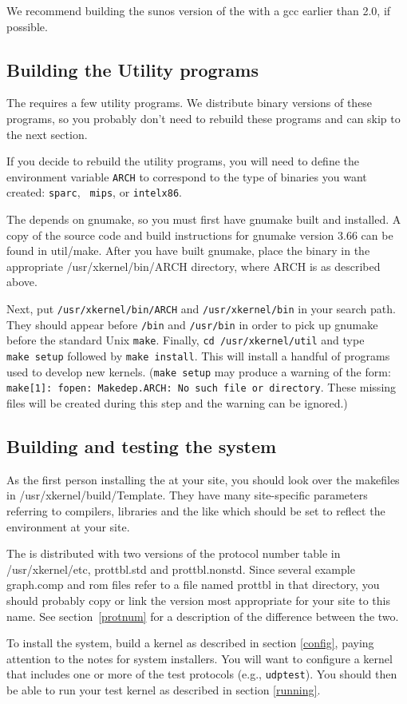 We recommend building the sunos version of the \xk{} with a gcc
earlier than 2.0, if possible.


\subsection{Building the Utility programs}

The \xk{} requires a few utility programs.  We distribute
binary versions of these programs, so you probably don't need to
rebuild these programs and can skip to the next section.

If you decide to rebuild the utility programs, 
you will need to define the environment variable {\tt ARCH} to
correspond to the type of binaries you want created: {\tt sparc}, {\tt
mips}, or {\tt intelx86}.

The \xk{} depends on gnumake, so you must first have gnumake built and
installed.  A copy of the source code and build instructions for
gnumake version 3.66 can be found in util/make.  After you have built
gnumake, place the binary in the appropriate /usr/xkernel/bin/ARCH
directory, where ARCH is as described above.

Next, put {\tt /usr/xkernel/bin/ARCH} and {\tt /usr/xkernel/bin}
in your search path.
They should appear before {\tt /bin} and {\tt /usr/bin} in
order to pick up gnumake before the standard Unix {\tt make}. Finally,
{\tt cd~/usr/xkernel/util} and type {\tt make~setup} followed by 
{\tt make~install}.  This will install a handful of programs used to
develop new kernels.  ({\tt make~setup} may produce a warning of the
form:  {\tt make[1]: fopen: Makedep.ARCH: No such file or directory}.
These missing files will be created during this step and the warning can
be ignored.)


\subsection{Building and testing the system}

As the first person installing the \xk{} at your site, you should look
over the makefiles in /usr/xkernel/build/Template.  They have many
site-specific parameters referring to compilers, libraries and the
like which should be set to reflect the environment at your site.

The \xk{} is distributed with two versions of the protocol number
table in {\sanss /usr/xkernel/etc}, {\sanss prottbl.std} and {\sanss
prottbl.nonstd}.  Since several example graph.comp and rom files refer
to a file named {\sanss prottbl} in that directory, you should
probably copy or link the version most appropriate for your site to
this name.  See section~\ref{protnum} for a description of the
difference between the two.

To install the system, build a kernel as described in section
\ref{config}, paying attention to the notes for system installers. 
You will want to configure a kernel that includes one or more of the
test protocols (e.g., {\tt udptest}).  You should then be able to run
your test kernel as described in section \ref{running}.

